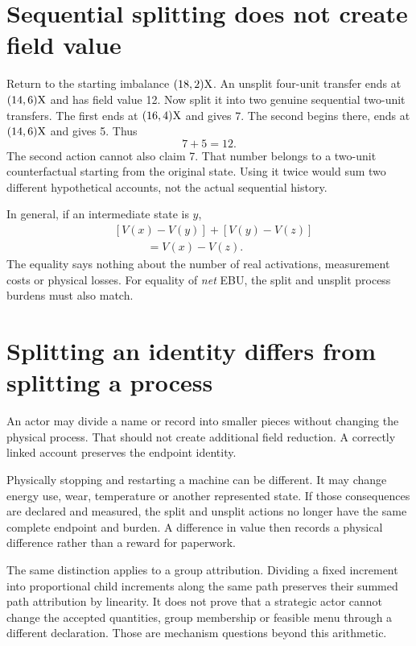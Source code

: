 \section{Sequential splitting does not create field value}
Return to the starting imbalance $(18,2)\mathrm{X}$. An unsplit four-unit transfer ends at $(14,6)\mathrm{X}$ and has field value 12. Now split it into two genuine sequential two-unit transfers. The first ends at $(16,4)\mathrm{X}$ and gives 7. The second begins there, ends at $(14,6)\mathrm{X}$ and gives 5. Thus
\[
 7+5=12.
\]
The second action cannot also claim 7. That number belongs to a two-unit counterfactual starting from the original state. Using it twice would sum two different hypothetical accounts, not the actual sequential history.

In general, if an intermediate state is $y$,
\begin{align}
 &[V(x)-V(y)]+[V(y)-V(z)]\\
 &\hspace{35pt}=V(x)-V(z).
\end{align}
The equality says nothing about the number of real activations, measurement costs or physical losses. For equality of \emph{net} EBU, the split and unsplit process burdens must also match.

\section{Splitting an identity differs from splitting a process}
An actor may divide a name or record into smaller pieces without changing the physical process. That should not create additional field reduction. A correctly linked account preserves the endpoint identity.

Physically stopping and restarting a machine can be different. It may change energy use, wear, temperature or another represented state. If those consequences are declared and measured, the split and unsplit actions no longer have the same complete endpoint and burden. A difference in value then records a physical difference rather than a reward for paperwork.

The same distinction applies to a group attribution. Dividing a fixed increment into proportional child increments along the same path preserves their summed path attribution by linearity. It does not prove that a strategic actor cannot change the accepted quantities, group membership or feasible menu through a different declaration. Those are mechanism questions beyond this arithmetic.


